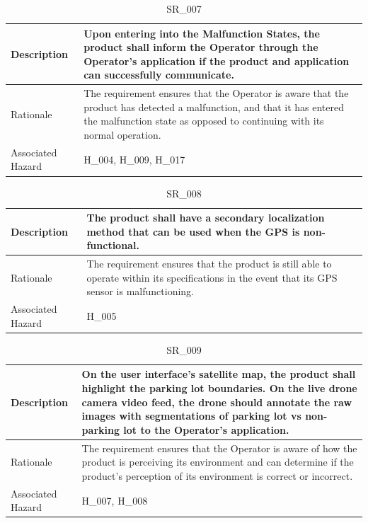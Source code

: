 \documentclass{article}
\begin{document}
\begin{table}[!h]
\begin{center}
\caption {SR\_007} 
\label{SR_007}
\begin{tabular}{ | m{3cm} | m{11cm} | }
\hline
Description & Upon entering into the Malfunction States, the product shall inform the Operator through the Operator's application if the product and application can successfully communicate. \\
\hline
Rationale & The requirement ensures that the Operator is aware that the product has detected a malfunction, and that it has entered the malfunction state as opposed to continuing with its normal operation. \\
\hline
Associated Hazard & H\_004, H\_009, H\_017 \\
\hline
\end{tabular}
\end{center}
\end{table}

\begin{table}[!h]
\begin{center}
\caption {SR\_008} 
\label{SR_008}
\begin{tabular}{ | m{3cm} | m{11cm} | }
\hline
Description & The product shall have a secondary localization method that can be used when the GPS is non-functional. \\
\hline
Rationale & The requirement ensures that the product is still able to operate within its specifications in the event that its GPS sensor is malfunctioning. \\
\hline
Associated Hazard & H\_005 \\
\hline
\end{tabular}
\end{center}
\end{table}

\begin{table}[!h]
\begin{center}
\caption {SR\_009} 
\label{SR_009}
\begin{tabular}{ | m{3cm} | m{11cm} | }
\hline
Description & On the user interface's satellite map, the product shall highlight the parking lot boundaries. On the live drone camera video feed, the drone should annotate the raw images with segmentations of parking lot vs non-parking lot to the Operator's application. \\
\hline
Rationale & The requirement ensures that the Operator is aware of how the product is perceiving its environment and can determine if the product's perception of its environment is correct or incorrect. \\
\hline
Associated Hazard & H\_007, H\_008 \\
\hline
\end{tabular}
\end{center}
\end{table}
\end{document}
